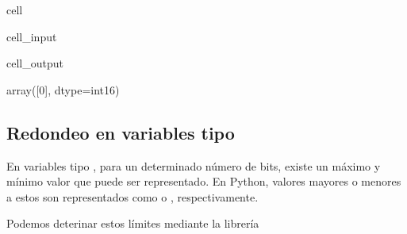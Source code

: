 \documentclass[letterpaper,10pt,english]{jupyterBook}
\begin{document}
\begin{sphinxuseclass}{cell}\begin{sphinxVerbatimInput}

\begin{sphinxuseclass}{cell_input}
\begin{sphinxVerbatim}[commandchars=\\\{\}]
   
 
\end{sphinxVerbatim}

\end{sphinxuseclass}\end{sphinxVerbatimInput}
\begin{sphinxVerbatimOutput}

\begin{sphinxuseclass}{cell_output}
\begin{sphinxVerbatim}[commandchars=\\\{\}]
array([0], dtype=int16)
\end{sphinxVerbatim}

\end{sphinxuseclass}\end{sphinxVerbatimOutput}

\end{sphinxuseclass}

\subsection{Redondeo en variables tipo }
\label{\detokenize{1.1-Aspectos_generales/1.1-Aspectos_generales:redondeo-en-variables-tipo-float}}
\sphinxAtStartPar
En variables tipo , para un determinado número de bits, existe un máximo y mínimo valor que puede ser representado. En Python, valores mayores o menores a estos son representados como  o , respectivamente.

\sphinxAtStartPar
Podemos deterinar estos límites mediante la librería 
\end{document}

